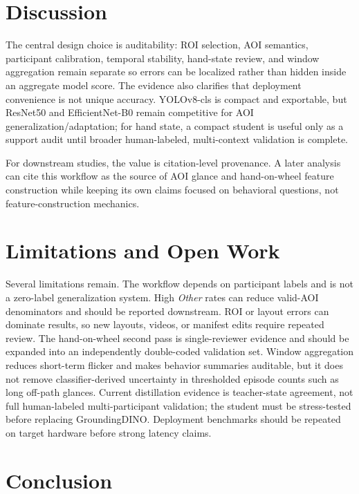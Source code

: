 \documentclass[sigconf,review,anonymous]{acmart}
\begin{document}
\section{Discussion}

The central design choice is auditability: ROI selection, AOI semantics,
participant calibration, temporal stability, hand-state review, and
window aggregation remain separate so errors can be localized rather than
hidden inside an aggregate model score. The evidence also clarifies that
deployment convenience is not unique accuracy. YOLOv8-cls is compact and
exportable, but ResNet50 and EfficientNet-B0 remain competitive for AOI
generalization/adaptation; for hand state, a compact student is useful
only as a support audit until broader human-labeled, multi-context
validation is complete.

For downstream studies, the value is citation-level provenance. A later
analysis can cite this workflow as the source of AOI glance and
hand-on-wheel feature construction while keeping its own claims focused
on behavioral questions, not feature-construction mechanics.

\section{Limitations and Open Work}
\label{sec:remaining_work}

Several limitations remain. The workflow depends on participant labels
and is not a zero-label generalization system. High \textit{Other} rates
can reduce valid-AOI denominators and should be reported downstream. ROI
or layout errors can dominate results, so new layouts, videos, or
manifest edits require repeated review. The hand-on-wheel second pass is
single-reviewer evidence and should be expanded into an independently
double-coded validation set. Window aggregation reduces short-term
flicker and makes behavior summaries auditable, but it does not remove
classifier-derived uncertainty in thresholded episode counts such as long
off-path glances. Current distillation evidence is teacher-state
agreement, not full human-labeled multi-participant validation; the
student must be stress-tested before replacing GroundingDINO. Deployment
benchmarks should be repeated on target hardware before strong latency
claims.

\section{Conclusion}
\end{document}
